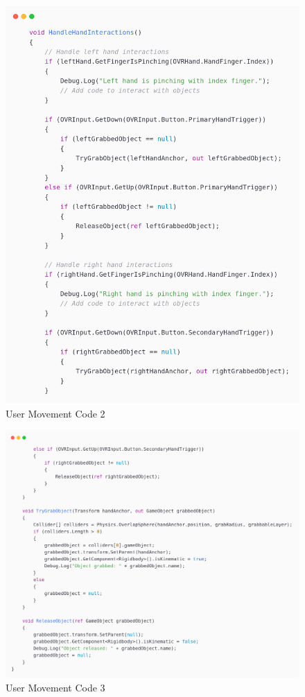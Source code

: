 \begin{figure}[h] 
	\centering
	\includegraphics[width=1\textwidth, height=0.7\textheight]{Images/playerp2.png}
	\caption{User Movement Code 2}
	\label{fig:User Movement Code 2}
\end{figure}
\newpage
{}
\newline
\begin{figure}[h] 
	\centering
	\includegraphics[width=1\textwidth, height=0.7\textheight]{Images/playerp3.png}
	\caption{User Movement Code 3}
	\label{fig:User Movement Code 3}
\end{figure}
